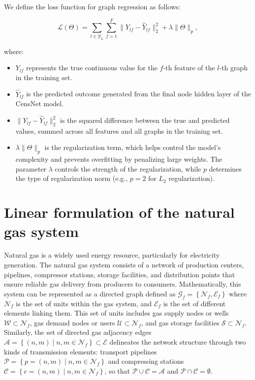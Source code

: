 We define the loss function for graph regression as follows:

\begin{equation}
\mathcal{L}(\Theta) = \sum_{l \in \mathcal{Y}_L} \sum_{f=1}^{F} \| Y_{lf} - \hat{Y}_{lf} \|^2_2 + \lambda \|\Theta\|_p,
\end{equation}

where:

\begin{itemize}
    \item \( Y_{lf} \) represents the true continuous value for the \( f \)-th feature of the \( l \)-th graph in the training set.
    \item \( \hat{Y}_{lf} \) is the predicted outcome generated from the final node hidden layer of the CensNet model.
    \item \( \| Y_{lf} - \hat{Y}_{lf} \|^2_2 \) is the squared difference between the true and predicted values, summed across all features and all graphs in the training set.
    \item \( \lambda \|\Theta\|_p \) is the regularization term, which helps control the model's complexity and prevents overfitting by penalizing large weights. The parameter \( \lambda \) controls the strength of the regularization, while \( p \) determines the type of regularization norm (e.g., \( p=2 \) for \( L_2 \) regularization).
\end{itemize}



\section{Linear formulation of the natural gas system} \label{sec:LinealCensnet_formulation}


Natural gas is a widely used energy resource, particularly for electricity generation. The natural gas system consists of a network of production centers, pipelines, compressor stations, storage facilities, and distribution points that ensure reliable gas delivery from producers to consumers. Mathematically, this system can be represented as a directed graph defined as $\mathcal{G}_f = \left\{\mathcal{N}_f, \mathcal{E}_f\right\}$ where $\mathcal{N}_f$ is the set of units within the gas system, and $ \mathcal{E}_f$ is the set of different elements linking them. This set of units includes gas supply nodes or wells $\mathcal{W} \subset \mathcal{N}_{f}$, gas demand nodes or users $\mathcal{U} \subset \mathcal{N}_{f}$, and gas storage facilities $\mathcal{S} \subset \mathcal{N}_{f}$. Similarly, the set of directed gas adjacency edges $\mathcal{A} = \left\{(n,m) \mid n,m\in\mathcal{N}_f \right\} \subset \mathcal{E}$ delineates the network structure through two kinds of transmission elements: transport pipelines $\mathcal{P} = \left\{p=(n,m) \mid n,m\in\mathcal{N}_f \right\}$ and compressing stations $\mathcal{C} = \left\{c=(n,m) \mid n,m\in\mathcal{N}_f \right\}$, so that $\mathcal{P}\cup\mathcal{C}=\mathcal{A}$ and $\mathcal{P}\cap\mathcal{C}=\emptyset$.


